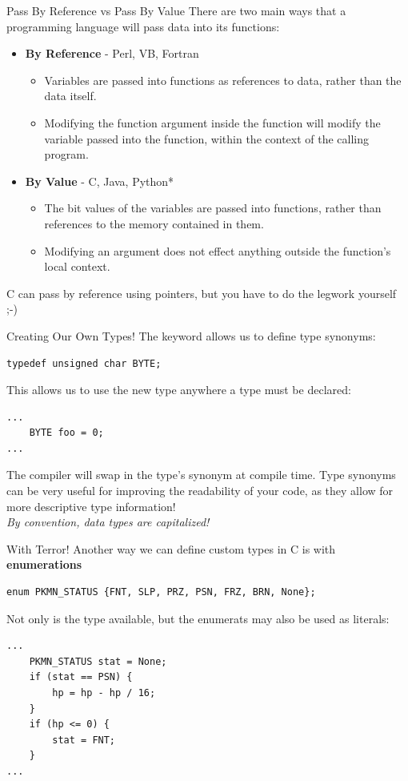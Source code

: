 \documentclass[11pt]{beamer}
\let\OldTexttt\texttt
\renewcommand{\texttt}[1]{\OldTexttt{\color{teal}{#1}}}
\begin{document}
\begin{frame}{Pass By Reference vs Pass By Value}
There are two main ways that a programming language will pass data into its functions:
\begin{itemize}
\item \textbf{By Reference} - Perl, VB, Fortran
\begin{itemize}
\item Variables are passed into functions as references to data, rather than the data itself.  
\item Modifying the function argument inside the function will modify the variable passed into the function, within the context of the calling program.  
\end{itemize}
\item \textbf{By Value} - C, Java, Python*
\begin{itemize}
\item The bit values of the variables are passed into functions, rather than references to the memory contained in them.  
\item Modifying an argument does not effect anything outside the function's local context.
\end{itemize}
\end{itemize}
C can pass by reference using pointers, but you have to do the legwork yourself ;-)
\end{frame}

\begin{frame}[fragile=singleslide]{Creating Our Own Types!}
The \texttt{typedef} keyword allows us to define type synonyms:
\begin{lstlisting}[style=C]
typedef unsigned char BYTE; 
\end{lstlisting} 
This allows us to use the new type \texttt{BYTE} anywhere a type must be declared:
\begin{lstlisting}[style=C]
...
	BYTE foo = 0;
...
\end{lstlisting} 
The compiler will swap in the type's synonym at compile time. Type synonyms can be very useful for improving the readability of your code, as they allow for more descriptive type information! \\
\emph{By convention, data types are capitalized!}
\end{frame}


\begin{frame}[fragile=singleslide]{\texttt{enum} With Terror!}
Another way we can define custom types in C is with \textbf{enumerations}
\begin{lstlisting}[style=C]
enum PKMN_STATUS {FNT, SLP, PRZ, PSN, FRZ, BRN, None}; 
\end{lstlisting}
Not only is the type available, but the enumerats may also be used as literals:
\begin{lstlisting}[style=C]
... 
	PKMN_STATUS stat = None;
	if (stat == PSN) {
		hp = hp - hp / 16;
	} 
	if (hp <= 0) {
		stat = FNT;
	}
...
\end{lstlisting}
\end{frame}
\end{document}
